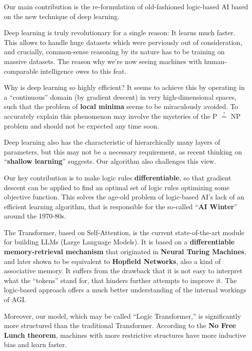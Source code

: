 \begin{preface}

Our main contribution is the re-formulation of old-fashioned logic-based AI based on the new technique of deep learning.

Deep learning is truly revolutionary for a single reason:  It learns much faster.  This allows to handle huge datasets which were perviously out of consideration, and crucially, common-sense reasoning by its nature has to be training on massive datasets.  The reason why we're now seeing machines with human-comparable intelligence owes to this feat.  

Why is deep learning so highly efficient?  It seems to achieve this by operating in a ``continuous'' domain (by gradient descent) in very high-dimensional spaces, such that the problem of \textbf{local minima} seems to be miraculously avoided.  To accurately explain this phenomenon may involve the mysteries of the P $\stackrel{?}{=}$ NP problem and should not be expected any time soon.

Deep learning also has the characteristic of hierarchically many layers of parameters, but this may not be a necessary requirement, as recent thinking on ``\textbf{shallow learning}'' suggests.  Our algorithm also challenges this view.

Our key contribution is to make logic rules \textbf{differentiable}, so that gradient descent can be applied to find an optimal set of logic rules optimizing some objective function.  This solves the age-old problem of logic-based AI's lack of an efficient learning algorithm, that is responsible for the so-called ``\textbf{AI Winter}'' around the 1970-80s.

The Transformer, based on Self-Attention, is the current state-of-the-art module for building LLMs (Large Language Models).  It is based on a \textbf{differentiable memory-retrieval mechanism} that originated in \textbf{Neural Turing Machines}, and later shown to be equivalent to \textbf{Hopfield Networks}, also a kind of associative memory.  It suffers from the drawback that it is not easy to interpret what the ``tokens'' stand for, that hinders further attempts to improve it.  The logic-based approach offers a much better understanding of the internal workings of AGI.

Moreover, our model, which may be called ``Logic Transformer,'' is significantly more structured than the traditional Transformer.  According to the \textbf{No Free Lunch theorem}, machines with more restrictive structures have more inductive bias and learn faster.


\end{preface}
